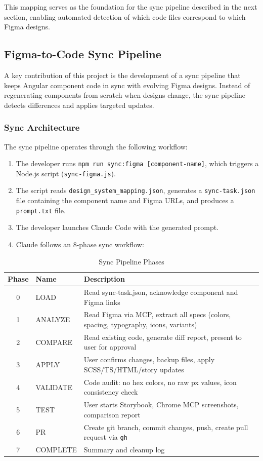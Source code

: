 This mapping serves as the foundation for the sync pipeline described in the next section, enabling automated detection of which code files correspond to which Figma designs.

\subsection{Figma-to-Code Sync Pipeline}
\label{sec:sync}

A key contribution of this project is the development of a sync pipeline that keeps Angular component code in sync with evolving Figma designs. Instead of regenerating components from scratch when designs change, the sync pipeline detects differences and applies targeted updates.

\subsubsection{Sync Architecture}

The sync pipeline operates through the following workflow:

\begin{enumerate}
    \item The developer runs \texttt{npm run sync:figma [component-name]}, which triggers a Node.js script (\texttt{sync-figma.js}).
    \item The script reads \texttt{design\_system\_mapping.json}, generates a \texttt{sync-task.json} file containing the component name and Figma URLs, and produces a \texttt{prompt.txt} file.
    \item The developer launches Claude Code with the generated prompt.
    \item Claude follows an 8-phase sync workflow:
\end{enumerate}

\begin{table}[H]
\centering
\caption{Sync Pipeline Phases}
\label{tab:sync_phases}
\begin{tabular}{|c|l|p{8cm}|}
\hline
\textbf{Phase} & \textbf{Name} & \textbf{Description} \\ \hline
0 & LOAD & Read sync-task.json, acknowledge component and Figma links \\ \hline
1 & ANALYZE & Read Figma via MCP, extract all specs (colors, spacing, typography, icons, variants) \\ \hline
2 & COMPARE & Read existing code, generate diff report, present to user for approval \\ \hline
3 & APPLY & User confirms changes, backup files, apply SCSS/TS/HTML/story updates \\ \hline
4 & VALIDATE & Code audit: no hex colors, no raw px values, icon consistency check \\ \hline
5 & TEST & User starts Storybook, Chrome MCP screenshots, comparison report \\ \hline
6 & PR & Create git branch, commit changes, push, create pull request via \texttt{gh} \\ \hline
7 & COMPLETE & Summary and cleanup log \\ \hline
\end{tabular}
\end{table}


